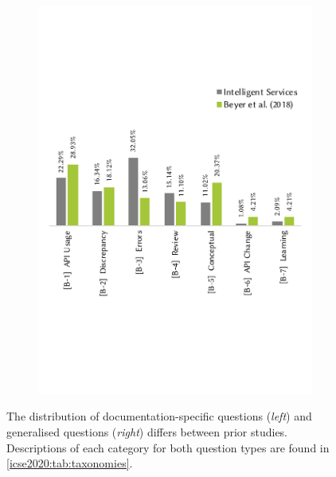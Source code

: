 \begin{figure}[bth]
  \hfill
  \begin{subfigure}[c]{0.49\linewidth}
    \centering
    \includegraphics[width=\linewidth]{mainmatter/publications/figures/icse2020/b-compare.pdf}
  \end{subfigure}
    \centering
    \caption[Distribution of issues on Stack Overflow]{The distribution of documentation-specific questions (\textit{left}) and generalised questions (\textit{right}) differs between prior studies. Descriptions of each category for both question types are found in \cref{icse2020:tab:taxonomies}.}
    \label{fig:conclusion:question-diff}
\end{figure}


